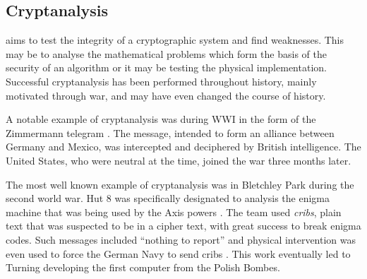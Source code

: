 

\subsection{Cryptanalysis}

 aims to test the integrity of a cryptographic system and find weaknesses. This may be to analyse the mathematical problems which form the basis of the security of an algorithm or it may be testing the physical implementation. Successful cryptanalysis has been performed throughout history, mainly motivated through war, and may have even changed the course of history.

A notable example of cryptanalysis was during WWI in the form of the Zimmermann telegram \cite{zimmermann1917}. The message, intended to form an alliance between Germany and Mexico, was intercepted and deciphered by British intelligence. The United States, who were neutral at the time, joined the war three months later.

The most well known example of cryptanalysis was in Bletchley Park during the second world war. Hut 8 was specifically designated to analysis the enigma machine that was being used by the Axis powers \cite{hodges2012alan}. The team used \emph{cribs}, plain text that was suspected to be in a cipher text, with great success to break enigma codes. Such messages included ``nothing to report'' and physical intervention was even used to force the German Navy to send cribs \cite{hodges2012alan}. This work eventually led to Turning developing the first computer from the Polish Bombes.

%
%
%
%

